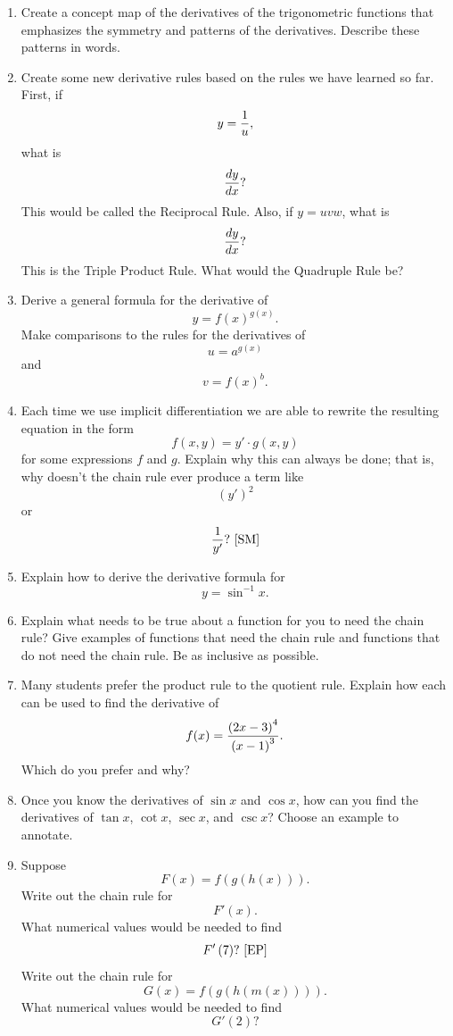 \begin{enumerate}
\item  Create a concept map of the derivatives of the trigonometric functions that emphasizes the symmetry and patterns of the derivatives.  Describe these patterns in words. 

\item  Create some new derivative rules based on the rules we have learned so far.  First, if $$y = {1 \over u},$$ what is $${{dy} \over {dx}}?$$  This would be called the Reciprocal Rule.  Also, if $y = uvw$, what is $${{dy} \over {dx}}?$$  This is the Triple Product Rule.  What would the Quadruple Rule be?  

\item  Derive a general formula for the derivative of $$y = f(x)^{g(x)} .$$  Make comparisons to the rules for the derivatives of $$u = a^{g(x)} $$ and $$v = f(x)^b .$$

\item  Each time we use implicit differentiation we are able to rewrite the resulting equation in the form $$f(x,y) = y' \cdot g(x,y)$$ for some expressions $f$ and $g$.  Explain why this can always be done; that is, why doesn't the chain rule ever produce a term like $$(y')^2 $$ or $${1 \over {y'}}?  \ \cite{SM}$$   

\item  Explain how to derive the derivative formula for $$y = \sin ^{ - 1} x.$$

\item  Explain what needs to be true about a function for you to need the chain rule?  Give examples of functions that need the chain rule and functions that do not need the chain rule.  Be as inclusive as possible.

\item  Many students prefer the product rule to the quotient rule.  Explain how each can be used to find the derivative of $$f(x) = {{\left( {2x - 3} \right)^4 } \over {\left( {x - 1} \right)^3 }}.$$  Which do you prefer and why?

\item  Once you know the derivatives of $\sin x$ and $\cos x$, how can you find the derivatives of 
$\tan x$, $\cot x$, $\sec x$, and $\csc x$?   Choose an example to annotate.   \cite{FWG}

\item  Suppose $$F(x) = f\left( {g\left( {h(x)} \right)} \right).$$  Write out the chain rule for $$F'\left( x \right).$$  What numerical values would be needed to find $$F'\left( 7 \right)? \ \cite{EP}$$    Write out the chain rule for $$G(x) = f\left( {g\left( {h\left( {m\left( x \right)} \right)} \right)} \right).$$ What numerical values would be needed to find $$G'\left( 2 \right)?$$


\end{enumerate}
